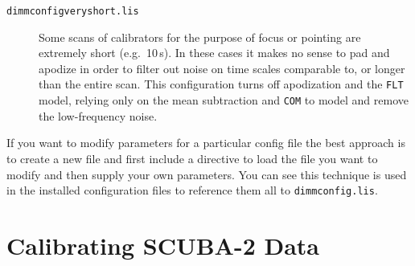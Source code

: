 \documentclass[twoside,11pt]{article}
\newcommand{\xlabel}[1]{}
\renewcommand{\_}{\texttt{\symbol{95}}}
\begin{document}
\begin{description}
\item[\texttt{dimmconfig\_veryshort.lis}]\quad Some scans of
  calibrators for the purpose of focus or pointing are extremely short
  (e.g.~10\,s). In these cases it makes no sense to pad and apodize in
  order to filter out noise on time scales comparable to, or longer
  than the entire scan. This configuration turns off apodization and
  the \texttt{FLT} model, relying only on the mean subtraction and
  \texttt{COM} to model and remove the low-frequency noise.



\end{description}

If you want to modify parameters for a particular config file the best
approach is to create a new file and first include a directive to load
the file you want to modify and then supply your own parameters. You
can see this technique is used in the installed configuration files to
reference them all to \texttt{dimmconfig.lis}.

\section{\xlabel{calib}Calibrating SCUBA-2 Data}
\label{sec:calib}
\end{document}
